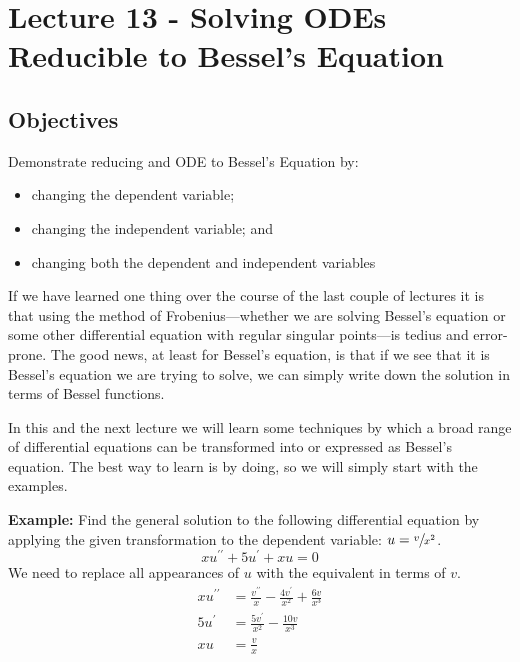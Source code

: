 \chapter{Lecture 13 - Solving ODEs Reducible to Bessel's Equation}
\label{ch:lec13}
\section{Objectives}
Demonstrate reducing and ODE to Bessel's Equation by:
\begin{itemize}
\item changing the dependent variable;
\item changing the independent variable; and
\item changing both the dependent and independent variables
\end{itemize}

If we have learned one thing over the course of the last couple of lectures it is that using the method of Frobenius---whether we are solving Bessel's equation or some other differential equation with regular singular points---is tedius and error-prone.  The good news, at least for Bessel's equation, is that if we see that it is Bessel's equation we are trying to solve, we can simply write down the solution in terms of Bessel functions.

In this and the next lecture we will learn some techniques by which a broad range of differential equations can be transformed into or expressed as Bessel's equation.  The best way to learn is by doing, so we will simply start with the examples.

\vspace{0.5cm}

\noindent\textbf{Example:} Find the general solution to the following differential equation by applying the given transformation to the dependent variable: $u = \sfrac{v}{x^2}$.
\begin{equation*}
xu^{\prime \prime} + 5u^{\prime} + xu = 0
\end{equation*}
We need to replace all appearances of $u$ with the equivalent in terms of $v$.
\begin{align*}
xu^{\prime \prime} &= \frac{v^{\prime \prime}}{x} - \frac{4v^{\prime}}{x^2} + \frac{6v}{x^3} \\
5u^{\prime} &= \frac{5v^{\prime}}{x^2} - \frac{10v}{x^{3}} \\
xu &= \frac{v}{x}
\end{align*}

